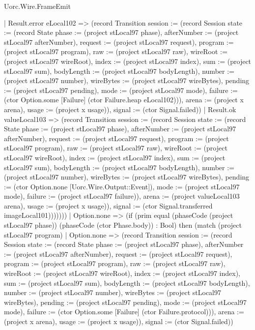 \begin{lexlean}{Uorc.Wire.FrameEmit}
\begin{semanticmodule}
{            | Result.error eLocal102 => (record Transition {session := (record Session {state := (record State {phase := (project stLocal97 phase), afterNumber := (project stLocal97 afterNumber), request := (project stLocal97 request), program := (project stLocal97 program), raw := (project stLocal97 raw), wireRoot := (project stLocal97 wireRoot), index := (project stLocal97 index), sum := (project stLocal97 sum), bodyLength := (project stLocal97 bodyLength), number := (project stLocal97 number), wireBytes := (project stLocal97 wireBytes), pending := (project stLocal97 pending), mode := (project stLocal97 mode), failure := (ctor Option.some [Failure] (ctor Failure.heap eLocal102))}), arena := (project x arena), usage := (project x usage)}), signal := (ctor Signal.failed)})
            | Result.ok valueLocal103 => (record Transition {session := (record Session {state := (record State {phase := (project stLocal97 phase), afterNumber := (project stLocal97 afterNumber), request := (project stLocal97 request), program := (project stLocal97 program), raw := (project stLocal97 raw), wireRoot := (project stLocal97 wireRoot), index := (project stLocal97 index), sum := (project stLocal97 sum), bodyLength := (project stLocal97 bodyLength), number := (project stLocal97 number), wireBytes := (project stLocal97 wireBytes), pending := (ctor Option.none [Uorc.Wire.Output::Event]), mode := (project stLocal97 mode), failure := (project stLocal97 failure)}), arena := (project valueLocal103 arena), usage := (project x usage)}), signal := (ctor Signal.transferred imageLocal101)}))))))
      | Option.none => (if (prim equal (phaseCode (project stLocal97 phase)) (phaseCode (ctor Phase.body)) : Bool) then (match (project stLocal97 program)
        | Option.none => (record Transition {session := (record Session {state := (record State {phase := (project stLocal97 phase), afterNumber := (project stLocal97 afterNumber), request := (project stLocal97 request), program := (project stLocal97 program), raw := (project stLocal97 raw), wireRoot := (project stLocal97 wireRoot), index := (project stLocal97 index), sum := (project stLocal97 sum), bodyLength := (project stLocal97 bodyLength), number := (project stLocal97 number), wireBytes := (project stLocal97 wireBytes), pending := (project stLocal97 pending), mode := (project stLocal97 mode), failure := (ctor Option.some [Failure] (ctor Failure.protocol))}), arena := (project x arena), usage := (project x usage)}), signal := (ctor Signal.failed)})
}
\end{semanticmodule}
\end{lexlean}
